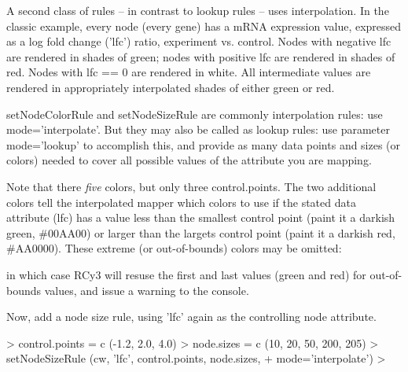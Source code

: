 \documentclass[12pt]{article}
\begin{document}
A second class of rules -- in contrast to lookup rules -- uses interpolation.  In the classic example, every node (every gene) has a mRNA expression
value, expressed as a log fold change ('lfc') ratio, experiment vs. control.  Nodes with negative lfc are rendered in
shades of green; nodes with positive lfc are rendered in shades of red.  Nodes with lfc == 0 are rendered in white.  All
intermediate values are rendered in appropriately interpolated shades of either green or red.

setNodeColorRule and setNodeSizeRule are commonly interpolation rules: use mode='interpolate'.  But they may also be called as lookup rules:  use parameter mode='lookup' to accomplish this, and provide as many data points and sizes (or colors) needed to cover all possible values of the attribute you are mapping.

\begin{Schunk}
\end{Schunk}
Note that there \emph{five} colors, but only three control.points.  The two additional colors tell the interpolated mapper which colors to use if the stated data attribute (lfc) has a value less than the smallest control point (paint it a darkish green, \#00AA00) or larger than the largets control point (paint it a darkish red, \#AA0000).  These extreme (or out-of-bounds) colors may be omitted:

\begin{Schunk}
\end{Schunk}

in which case RCy3 will resuse the first and last values (green and red) for out-of-bounds values, and issue a warning to the console.

Now, add a node size rule, using 'lfc' again as the controlling node attribute.

\begin{Schunk}
\begin{Sinput}
>   control.points = c (-1.2, 2.0, 4.0)
>   node.sizes     = c (10, 20, 50, 200, 205)
>   setNodeSizeRule (cw, 'lfc', control.points, node.sizes,
+                    mode='interpolate')
> 
\end{Sinput}
\end{Schunk}
\end{document}
